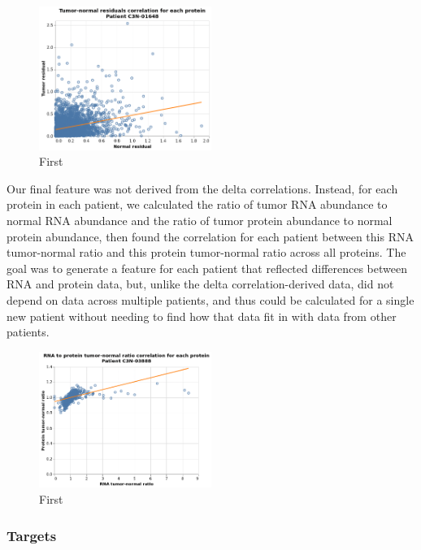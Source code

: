 \documentclass{article}
\begin{document}
\begin{figure}[H]
    \centering
    \includegraphics[width=0.5\textwidth]{tn_resid_corr}
    \caption{First}
    \label{fig:tn_resid_corr}
\end{figure}

Our final feature was not derived from the delta correlations. Instead, for each protein in each patient, we calculated the ratio of tumor RNA abundance to normal RNA abundance and the ratio of tumor protein abundance to normal protein abundance, then found the correlation for each patient between this RNA tumor-normal ratio and this protein tumor-normal ratio across all proteins. The goal was to generate a feature for each patient that reflected differences between RNA and protein data, but, unlike the delta correlation-derived data, did not depend on data across multiple patients, and thus could be calculated for a single new patient without needing to find how that data fit in with data from other patients.

\begin{figure}[H]
    \centering
    \includegraphics[width=0.5\textwidth]{tn_ratio_corr}
    \caption{First}
    \label{fig:tn_ratio_corr}
\end{figure}

\subsubsection{Targets}
\end{document}
